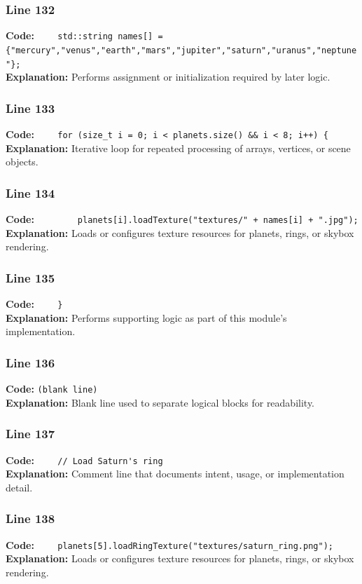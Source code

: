 \documentclass[11pt,a4paper]{article}
\begin{document}
\subsubsection*{Line 132}
\textbf{Code:} \verb|    std::string names[] = {"mercury","venus","earth","mars","jupiter","saturn","uranus","neptune"};|\\
\textbf{Explanation:} Performs assignment or initialization required by later logic.

\subsubsection*{Line 133}
\textbf{Code:} \verb|    for (size_t i = 0; i < planets.size() && i < 8; i++) {|\\
\textbf{Explanation:} Iterative loop for repeated processing of arrays, vertices, or scene objects.

\subsubsection*{Line 134}
\textbf{Code:} \verb|        planets[i].loadTexture("textures/" + names[i] + ".jpg");|\\
\textbf{Explanation:} Loads or configures texture resources for planets, rings, or skybox rendering.

\subsubsection*{Line 135}
\textbf{Code:} \verb|    }|\\
\textbf{Explanation:} Performs supporting logic as part of this module's implementation.

\subsubsection*{Line 136}
\textbf{Code:} \texttt{(blank line)}\\
\textbf{Explanation:} Blank line used to separate logical blocks for readability.

\subsubsection*{Line 137}
\textbf{Code:} \verb|    // Load Saturn's ring|\\
\textbf{Explanation:} Comment line that documents intent, usage, or implementation detail.

\subsubsection*{Line 138}
\textbf{Code:} \verb|    planets[5].loadRingTexture("textures/saturn_ring.png");|\\
\textbf{Explanation:} Loads or configures texture resources for planets, rings, or skybox rendering.
\end{document}
